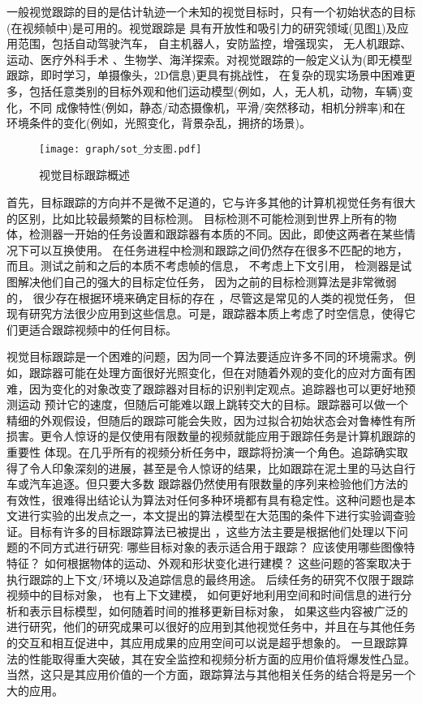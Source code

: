 \documentclass[promaster]{thesis-uestc}
\begin{document}
一般视觉跟踪的目的是估计轨迹一个未知的视觉目标时，只有一个初始状态的目标(在视频帧中)是可用的。视觉跟踪是
具有开放性和吸引力的研究领域(见图\ref{sot_分支图})及应用范围，包括自动驾驶汽车\cite{chang2019argoverse}，
自主机器人\cite{robin2016multi}，安防监控\cite{luo2018pedestrian}，增强现实\cite{klopschitz2010visual}，
无人机跟踪\cite{hao2018review}、运动\cite{manafifard2017survey}、医疗外科手术\cite{bouget2017vision}
、生物学\cite{ulman2017objective}、海洋探索\cite{luo2018underwater}。对视觉跟踪的一般定义认为(即无模型跟踪，即时学习，单摄像头，2D信息)更具有挑战性，
在复杂的现实场景中困难更多，包括任意类别的目标外观和他们运动模型(例如，人，无人机，动物，车辆)变化，不同
成像特性(例如，静态/动态摄像机，平滑/突然移动，相机分辨率)和在环境条件的变化(例如，光照变化，背景杂乱，拥挤的场景)。

\begin{figure}[htp]
	\centering  
	\texttt{[image: graph/sot\_分支图.pdf]}
	\caption{视觉目标跟踪概述}
	\label{sot_分支图}
\end{figure}

首先，目标跟踪的方向并不是微不足道的，它与许多其他的计算机视觉任务有很大的区别，比如比较最频繁的目标检测。
目标检测不可能检测到世界上所有的物体，检测器一开始的任务设置和跟踪器有本质的不同。因此，即使这两者在某些情况下可以互换使用。
在任务进程中检测和跟踪之间仍然存在很多不匹配的地方，而且。测试之前和之后的本质不考虑帧的信息， 不考虑上下文引用，
检测器是试图解决他们自己的强大的目标定位任务， 因为之前的目标检测算法是非常微弱的， 很少存在根据环境来确定目标的存在
，尽管这是常见的人类的视觉任务， 但现有研究方法很少应用到这些信息。可是，跟踪器本质上考虑了时空信息，使得它们更适合跟踪视频中的任何目标。

视觉目标跟踪是一个困难的问题，因为同一个算法要适应许多不同的环境需求。例如，跟踪器可能在处理方面很好光照变化，但在对随着外观的变化的应对方面有困难，因为变化的对象改变了跟踪器对目标的识别判定观点。追踪器也可以更好地预测运动
预计它的速度，但随后可能难以跟上跳转交大的目标。跟踪器可以做一个精细的外观假设，但随后的跟踪可能会失败，因为过拟合初始状态会对鲁棒性有所损害。更令人惊讶的是仅使用有限数量的视频就能应用于跟踪任务是计算机跟踪的重要性
体现。在几乎所有的视频分析任务中，跟踪将扮演一个角色。追踪确实取得了令人印象深刻的进展，甚至是令人惊讶的结果，比如跟踪在泥土里的马达自行车或汽车追逐。但只要大多数
跟踪器仍然使用有限数量的序列来检验他们方法的有效性，很难得出结论认为算法对任何多种环境都有具有稳定性。这种问题也是本文进行实验的出发点之一，本文提出的算法模型在大范围的条件下进行实验调查验证。目标有许多的目标跟踪算法已被提出
，这些方法主要是根据他们处理以下问题的不同方式进行研究: 哪些目标对象的表示适合用于跟踪？ 应该使用哪些图像特特征？ 
如何根据物体的运动、外观和形状变化进行建模？ 这些问题的答案取决于执行跟踪的上下文/环境以及追踪信息的最终用途。
后续任务的研究不仅限于跟踪视频中的目标对象， 也有上下文建模， 如何更好地利用空间和时间信息的进行分析和表示目标模型，如何随着时间的推移更新目标对象， 
如果这些内容被广泛的进行研究，他们的研究成果可以很好的应用到其他视觉任务中，并且在与其他任务的交互和相互促进中，其应用成果的应用空间可以说是超乎想象的。
一旦跟踪算法的性能取得重大突破，其在安全监控和视频分析方面的应用价值将爆发性凸显。当然，这只是其应用价值的一个方面，跟踪算法与其他相关任务的结合将是另一个大的应用。
\end{document}
